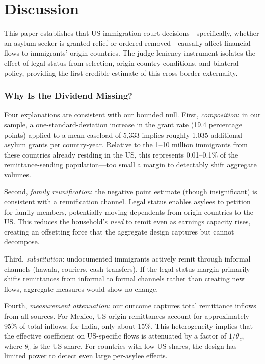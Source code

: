 \documentclass[12pt]{article}
\begin{document}


\section{Discussion}

This paper establishes that US immigration court decisions---specifically, whether an asylum seeker is granted relief or ordered removed---causally affect financial flows to immigrants' origin countries. The judge-leniency instrument isolates the effect of legal status from selection, origin-country conditions, and bilateral policy, providing the first credible estimate of this cross-border externality.

\subsubsection*{Why Is the Dividend Missing?} Four explanations are consistent with our bounded null. First, \emph{composition}: in our sample, a one-standard-deviation increase in the grant rate (19.4 percentage points) applied to a mean caseload of 5,333 implies roughly 1,035 additional asylum grants per country-year. Relative to the 1--10 million immigrants from these countries already residing in the US, this represents 0.01--0.1\% of the remittance-sending population---too small a margin to detectably shift aggregate volumes.

Second, \emph{family reunification}: the negative point estimate (though insignificant) is consistent with a reunification channel. Legal status enables asylees to petition for family members, potentially moving dependents from origin countries to the US. This reduces the household's \emph{need} to remit even as earnings capacity rises, creating an offsetting force that the aggregate design captures but cannot decompose.

Third, \emph{substitution}: undocumented immigrants actively remit through informal channels (hawala, couriers, cash transfers). If the legal-status margin primarily shifts remittances from informal to formal channels rather than creating new flows, aggregate measures would show no change.

Fourth, \emph{measurement attenuation}: our outcome captures total remittance inflows from all sources. For Mexico, US-origin remittances account for approximately 95\% of total inflows; for India, only about 15\%. This heterogeneity implies that the effective coefficient on US-specific flows is attenuated by a factor of $1/\theta_c$, where $\theta_c$ is the US share. For countries with low US shares, the design has limited power to detect even large per-asylee effects.
\end{document}
